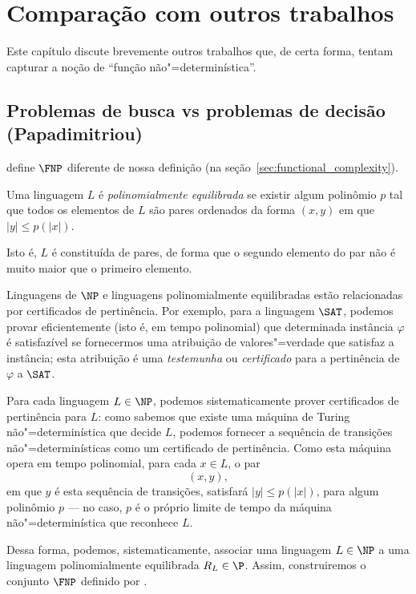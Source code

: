 \chapter{Comparação com outros trabalhos}

Este capítulo discute brevemente outros trabalhos que,
de certa forma,
tentam capturar a noção de ``função não"=determinística''.

\section{Problemas de busca vs problemas de decisão (Papadimitriou)}
\label{sec:papadimitriou_comparison}

define $\FNP$ diferente de nossa definição
(na seção~\ref{sec:functional_complexity}).

\begin{definition}
    Uma linguagem $L$ é \emph{polinomialmente equilibrada}
    se existir algum polinômio $p$ tal que
    todos os elementos de $L$ são pares ordenados da forma $(x, y)$
    em que $|y| \leq p(|x|)$.
\end{definition}
Isto é, $L$ é constituída de pares,
de forma que o segundo elemento do par não é muito maior que o primeiro elemento.

Linguagens de $\NP$ e linguagens polinomialmente equilibradas
estão relacionadas por certificados de pertinência.
Por exemplo,
para a linguagem $\SAT$,
podemos provar eficientemente
(isto é, em tempo polinomial)
que determinada instância $\varphi$ é satisfazível
se fornecermos uma atribuição de valores"=verdade que satisfaz a instância;
esta atribuição é uma \emph{testemunha} ou \emph{certificado}
para a pertinência de $\varphi$ a $\SAT$.

Para cada linguagem $L \in \NP$,
podemos sistematicamente prover certificados de pertinência para $L$:
como sabemos que existe uma máquina de Turing não"=determinística que decide $L$,
podemos fornecer a sequência de transições não"=determinísticas
como um certificado de pertinência.
Como esta máquina opera em tempo polinomial,
para cada $x \in L$,
o par
\begin{equation*}
    (x, y),
\end{equation*}
em que $y$ é esta sequência de transições,
satisfará $|y| \leq p(|x|)$,
para algum polinômio $p$
--- no caso, $p$ é o próprio limite de tempo da máquina não"=determinística
que reconhece $L$.

Dessa forma,
podemos, sistematicamente,
associar uma linguagem $L \in \NP$
a uma linguagem polinomialmente equilibrada $R_L \in \P$.
Assim,
construiremos o conjunto $\FNP$ definido por .

